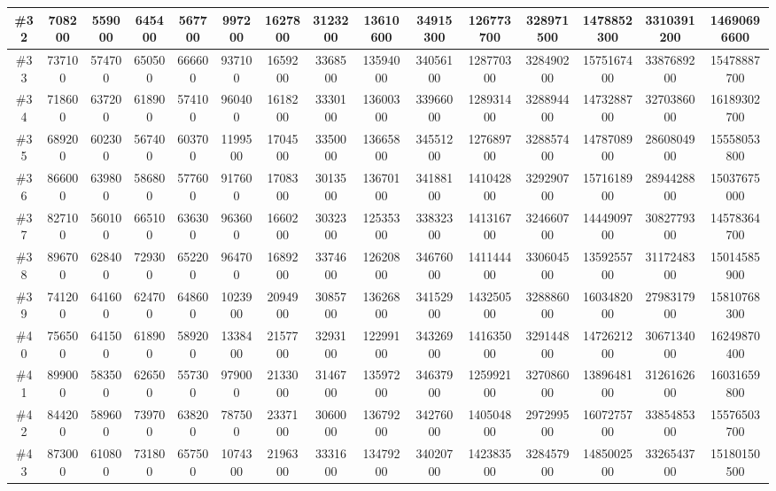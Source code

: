 \documentclass[titlepage]{article}
\begin{document}
\begin{landscape}
\begin{table}[h]
\begin{tabular}{|c|c|c|c|c|c|c|c|c|c|c|c|c|c|c|}
			\hline
			\#32     & 708200  & 559000  & 645400 & 567700  & 997200  & 1627800 & 3123200 & 13610600 & 34915300 & 126773700 & 328971500 & 1478852300 & 3310391200 & 14690696600  \\ 
			\hline
			\#33     & 737100  & 574700  & 650500 & 666600  & 937100  & 1659200 & 3368500 & 13594000 & 34056100 & 128770300 & 328490200 & 1575167400 & 3387689200 & 15478887700  \\ 
			\hline
			\#34     & 718600  & 637200  & 618900 & 574100  & 960400  & 1618200 & 3330100 & 13600300 & 33966000 & 128931400 & 328894400 & 1473288700 & 3270386000 & 16189302700  \\ 
			\hline
			\#35     & 689200  & 602300  & 567400 & 603700  & 1199500 & 1704500 & 3350000 & 13665800 & 34551200 & 127689700 & 328857400 & 1478708900 & 2860804900 & 15558053800  \\ 
			\hline
			\#36     & 866000  & 639800  & 586800 & 577600  & 917600  & 1708300 & 3013500 & 13670100 & 34188100 & 141042800 & 329290700 & 1571618900 & 2894428800 & 15037675000  \\ 
			\hline
			\#37     & 827100  & 560100  & 665100 & 636300  & 963600  & 1660200 & 3032300 & 12535300 & 33832300 & 141316700 & 324660700 & 1444909700 & 3082779300 & 14578364700  \\ 
			\hline
			\#38     & 896700  & 628400  & 729300 & 652200  & 964700  & 1689200 & 3374600 & 12620800 & 34676000 & 141144400 & 330604500 & 1359255700 & 3117248300 & 15014585900  \\ 
			\hline
			\#39     & 741200  & 641600  & 624700 & 648600  & 1023900 & 2094900 & 3085700 & 13626800 & 34152900 & 143250500 & 328886000 & 1603482000 & 2798317900 & 15810768300  \\ 
			\hline
			\#40     & 756500  & 641500  & 618900 & 589200  & 1338400 & 2157700 & 3293100 & 12299100 & 34326900 & 141635000 & 329144800 & 1472621200 & 3067134000 & 16249870400  \\ 
			\hline
			\#41     & 899000  & 583500  & 626500 & 557300  & 979000  & 2133000 & 3146700 & 13597200 & 34637900 & 125992100 & 327086000 & 1389648100 & 3126162600 & 16031659800  \\ 
			\hline
			\#42     & 844200  & 589600  & 739700 & 638200  & 787500  & 2337100 & 3060000 & 13679200 & 34276000 & 140504800 & 297299500 & 1607275700 & 3385485300 & 15576503700  \\ 
			\hline
			\#43     & 873000  & 610800  & 731800 & 657500  & 1074300 & 2196300 & 3331600 & 13479200 & 34020700 & 142383500 & 328457900 & 1485002500 & 3326543700 & 15180150500  \\ 

\end{tabular}
\end{table}
\end{landscape}
\end{document}
